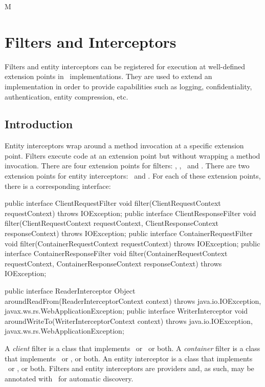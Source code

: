 M\chapter{Filters and Interceptors}
\label{filters_and_interceptors}

Filters and entity interceptors can be registered for execution at well-defined extension points in \jaxrs\ implementations. They are used to extend an implementation in order to provide capabilities such as logging, confidentiality, authentication, entity compression, etc. 

\section{Introduction}
\label{introduction_filters}
Entity interceptors wrap around a method invocation at a specific extension point. 
Filters execute code at an extension point but without wrapping a method invocation.  There are four extension points for filters: \ClientRequest, \ClientResponse, \ContainerRequest\ and \ContainerResponse. There are two extension points for entity interceptors: \ReadFrom\ and \WriteTo.  For each of these extension points, there is a corresponding interface:

\begin{listing}{1}
public interface ClientRequestFilter {
    void filter(ClientRequestContext requestContext) throws IOException;
}
public interface ClientResponseFilter {
    void filter(ClientRequestContext requestContext, 
        ClientResponseContext responseContext) throws IOException;
}
public interface ContainerRequestFilter {
    void filter(ContainerRequestContext requestContext) throws IOException;
}
public interface ContainerResponseFilter {
    void filter(ContainerRequestContext requestContext, 
        ContainerResponseContext responseContext) throws IOException;
}
\end{listing}

\begin{listing}{1}
public interface ReaderInterceptor {
    Object aroundReadFrom(ReaderInterceptorContext context)
        throws java.io.IOException, javax.ws.rs.WebApplicationException;
}
public interface WriterInterceptor {
    void aroundWriteTo(WriterInterceptorContext context)
        throws java.io.IOException, javax.ws.rs.WebApplicationException;
}
\end{listing}

A {\em client} filter is a class that implements \ClientRequestFilter\ or \ClientResponseFilter\, or both. A {\em container} filter is a class that implements \ContainerRequestFilter\ or \ContainerResponseFilter, or both. An entity interceptor is a class that implements \ReaderInterceptor\ or \WriterInterceptor, or both. Filters and entity interceptors are providers and, as such, may be annotated with \Provider\ for automatic discovery.

